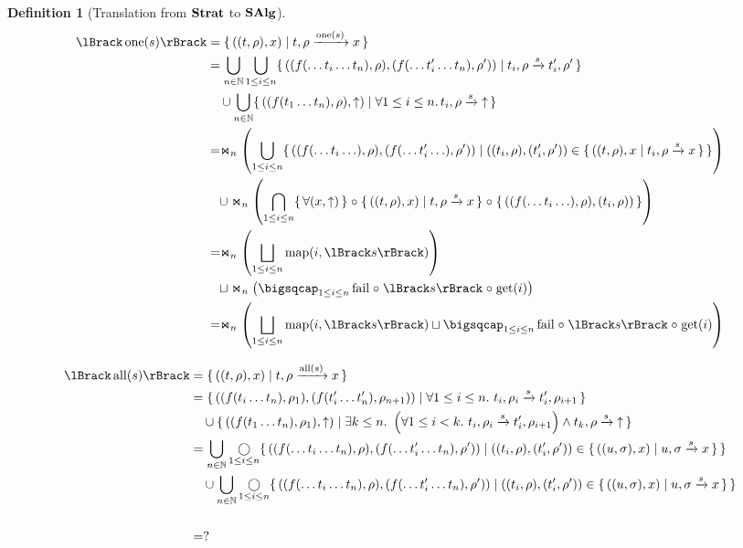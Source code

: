\documentclass{article}
\newtheorem{definition}[theorem]{Definition}
\begin{document}
\begin{definition}[Translation from $\mathbf{Strat}$ to $\mathbf{SAlg}$]
\begin{align*}
  \sem{\one{s}}
    &= \setbuild{((t,\rho),x)}{\transformx{t}{\rho}{\one{s}}{x}} \\
    &= \bigcup_{n \in \Nat} \bigcup_{1 \leq i \leq n} \setbuild{((f(\ldots t_i \ldots t_n),\rho),(f(\ldots t_i' \ldots t_n),\rho'))}{\transform{t_i}{\rho}{s}{t_i'}{\rho'}} \\
    &\quad \cup \bigcup_{n \in \Nat} \setbuild{((f(t_1 \ldots t_n),\rho),\fail)}{\forall 1 \leq i \leq n.\, \transformfail{t_i}{\rho}{s}} \\
    &= \witharity_{n} \left( \bigcup_{1 \leq i \leq n} \setbuild{ ((f(\ldots t_i \ldots),\rho),(f(\ldots t_i' \ldots),\rho')) }{ ((t_i,\rho),(t_i',\rho')) \in \setbuild{ ((t,\rho),x }{ \transformx{t_i}{\rho}{s}{x} } } \right) \\
    &\quad \cup \witharity_{n} \left( \bigcap_{1 \leq i \leq n}  \setbuildc{ \forall (x,\fail) } \comp \setbuild{ ((t,\rho),x)}{ \transformx{t}{\rho}{s}{x} } \comp \setbuildc{ ((f(\ldots t_i \ldots),\rho),(t_i,\rho)) } \right) \\
    &= \witharity_{n} \left( \bigsqcup_{1 \leq i \leq n} \map(i,\sem{s}) \right) \\
    &\quad \sqcup \witharity_{n} \left( \bigsqcap_{1 \leq i \leq n}  \lfail \comp \sem{s} \comp \get(i) \right) \\
    &= \witharity_{n} \left( \bigsqcup_{1 \leq i \leq n} \map(i, \sem{s}) \sqcup \bigsqcap_{1 \leq i \leq n} \lfail \comp \sem{s} \comp \get(i) \right)
\end{align*}

\begin{align*}
  \sem{\all{s}}
    &= {\setbuild{((t,\rho),x)}{\transformx{t}{\rho}{\all{s}}{x}}} \\
    &= {\setbuild{((f(t_i\ldots t_n),\rho_1),(f(t_i'\ldots t_n'),\rho_{n+1}))}{ \forall 1 \leq i \leq n.\ \transform{t_i}{\rho_i}{s}{t_i'}{\rho_{i+1}}}} \\
    &\quad \cup \setbuild { ((f(t_1 \ldots t_n),\rho_1),\fail) }{ \exists k \leq n.\ \left(\forall 1 \leq i < k.\ \transform{t_i}{\rho_i}{s}{t_i'}{\rho_{i+1}}\right) \land \transformfail{t_k}{\rho}{s} } \\
    &= \bigcup_{n \in \mathbb{N}} \mathop{\bigcirc}_{1\leq i \leq n} \setbuild{((f(\ldots t_i \ldots t_n),\rho),(f(\ldots t_i' \ldots t_n),\rho'))}{ ((t_i,\rho),(t_i',\rho')) \in \setbuild{ ((u,\sigma),x) }{ \transformx{u}{\sigma}{s}{x} } } \\
    &\quad \cup \bigcup_{n \in \mathbb{N}} \mathop{\bigcirc}_{1 \leq i \leq n} \setbuild{((f(\ldots t_i \ldots t_n),\rho),(f(\ldots t_i' \ldots t_n),\rho'))}{ ((t_i,\rho),(t_i',\rho')) \in \setbuild{ ((u,\sigma),x) }{ \transformx{u}{\sigma}{s}{x} } } \\
    &\qquad\qquad\qquad  \\
    &= ?
\end{align*}
  
\end{definition}
\end{document}
